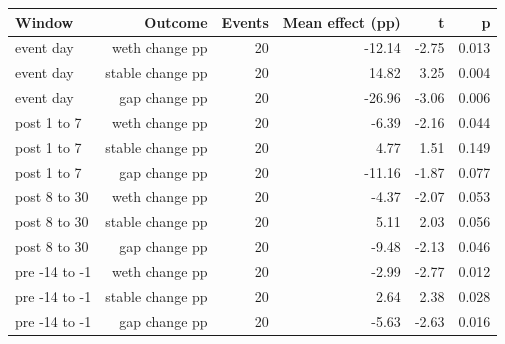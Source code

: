 \begin{tabular}{lrrrrr}
\toprule
Window & Outcome & Events & Mean effect (pp) & t & p \\
\midrule
event day & weth change pp & 20 & -12.14 & -2.75 & 0.013 \\
event day & stable change pp & 20 & 14.82 & 3.25 & 0.004 \\
event day & gap change pp & 20 & -26.96 & -3.06 & 0.006 \\
post 1 to 7 & weth change pp & 20 & -6.39 & -2.16 & 0.044 \\
post 1 to 7 & stable change pp & 20 & 4.77 & 1.51 & 0.149 \\
post 1 to 7 & gap change pp & 20 & -11.16 & -1.87 & 0.077 \\
post 8 to 30 & weth change pp & 20 & -4.37 & -2.07 & 0.053 \\
post 8 to 30 & stable change pp & 20 & 5.11 & 2.03 & 0.056 \\
post 8 to 30 & gap change pp & 20 & -9.48 & -2.13 & 0.046 \\
pre -14 to -1 & weth change pp & 20 & -2.99 & -2.77 & 0.012 \\
pre -14 to -1 & stable change pp & 20 & 2.64 & 2.38 & 0.028 \\
pre -14 to -1 & gap change pp & 20 & -5.63 & -2.63 & 0.016 \\
\bottomrule
\end{tabular}
